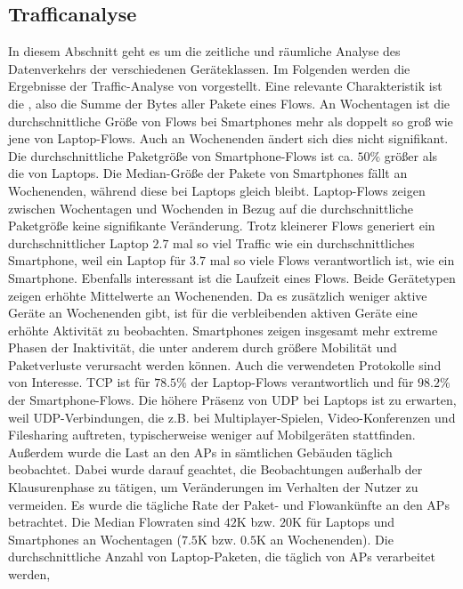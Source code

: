 \documentclass[12pt, a4paper]{article}
\begin{document}
\subsection{Trafficanalyse}

In diesem Abschnitt geht es um die zeitliche und räumliche Analyse des Datenverkehrs der verschiedenen Geräteklassen.
Im Folgenden werden die Ergebnisse der Traffic-Analyse von \cite{Alipour2018} vorgestellt.
Eine relevante Charakteristik ist die , also die Summe der Bytes aller Pakete eines Flows.
An Wochentagen ist die durchschnittliche Größe von Flows bei Smartphones mehr als doppelt so groß wie jene von Laptop-Flows.
Auch an Wochenenden ändert sich dies nicht signifikant. Die durchschnittliche Paketgröße von Smartphone-Flows
ist ca. $50 \%$ größer als die von Laptops. Die Median-Größe der Pakete von Smartphones fällt an Wochenenden, 
während diese bei Laptops gleich bleibt. Laptop-Flows zeigen zwischen Wochentagen und Wochenden in Bezug auf
die durchschnittliche Paketgröße keine signifikante Veränderung.
Trotz kleinerer Flows generiert ein durchschnittlicher Laptop $2.7$ mal so viel Traffic wie ein durchschnittliches Smartphone,
weil ein Laptop für $3.7$ mal so viele Flows verantwortlich ist, wie ein Smartphone.
\newline\newline
Ebenfalls interessant ist die Laufzeit eines Flows. Beide Gerätetypen zeigen erhöhte Mittelwerte an Wochenenden.
Da es zusätzlich weniger aktive Geräte an Wochenenden gibt, ist für die verbleibenden aktiven Geräte eine erhöhte Aktivität
zu beobachten. Smartphones zeigen insgesamt mehr extreme Phasen der Inaktivität, die unter anderem durch größere
Mobilität und Paketverluste verursacht werden können.
Auch die verwendeten Protokolle sind von Interesse. TCP ist für $78.5 \%$ der Laptop-Flows verantwortlich
und für $98.2 \%$ der Smartphone-Flows. Die höhere Präsenz von UDP bei Laptops ist zu erwarten, weil
UDP-Verbindungen, die z.B. bei Multiplayer-Spielen, Video-Konferenzen und Filesharing auftreten,
typischerweise weniger auf Mobilgeräten stattfinden.
Außerdem wurde die Last an den APs in sämtlichen Gebäuden täglich beobachtet. Dabei wurde darauf geachtet,
die Beobachtungen außerhalb der Klausurenphase zu tätigen, um Veränderungen im Verhalten der Nutzer zu vermeiden.
Es wurde die tägliche Rate der Paket- und Flowankünfte an den APs betrachtet. Die Median Flowraten sind
$42$\textsc{K} bzw. $20$\textsc{K} für Laptops und Smartphones an Wochentagen ($7.5$\textsc{K} bzw. $0.5$\textsc{K}
an Wochenenden). Die durchschnittliche Anzahl von Laptop-Paketen, die täglich von APs verarbeitet werden,
\end{document}
